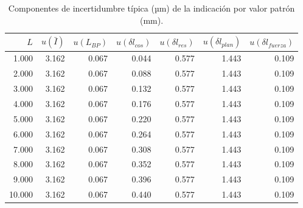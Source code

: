 \begin{table}[H]
\small
\centering
\caption{Componentes de incertidumbre típica (µm) de la indicación por valor patrón (mm).}
\label{tab:reloj-componentes}
\begin{tabular}{rrrrrrr}
\toprule
$L$ & $u(\bar I)$ & $u(L_{BP})$ & $u(\delta l_{cos})$ & $u(\delta l_{res})$ & $u(\delta l_{plan})$ & $u(\delta l_{fuerza})$ \\
\midrule
1.000 & 3.162 & 0.067 & 0.044 & 0.577 & 1.443 & 0.109 \\
2.000 & 3.162 & 0.067 & 0.088 & 0.577 & 1.443 & 0.109 \\
3.000 & 3.162 & 0.067 & 0.132 & 0.577 & 1.443 & 0.109 \\
4.000 & 3.162 & 0.067 & 0.176 & 0.577 & 1.443 & 0.109 \\
5.000 & 3.162 & 0.067 & 0.220 & 0.577 & 1.443 & 0.109 \\
6.000 & 3.162 & 0.067 & 0.264 & 0.577 & 1.443 & 0.109 \\
7.000 & 3.162 & 0.067 & 0.308 & 0.577 & 1.443 & 0.109 \\
8.000 & 3.162 & 0.067 & 0.352 & 0.577 & 1.443 & 0.109 \\
9.000 & 3.162 & 0.067 & 0.396 & 0.577 & 1.443 & 0.109 \\
10.000 & 3.162 & 0.067 & 0.440 & 0.577 & 1.443 & 0.109 \\
\bottomrule
\end{tabular}
\end{table}
